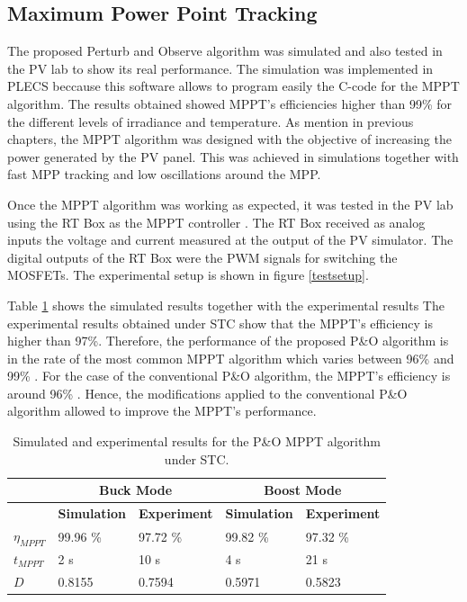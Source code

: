 \subsection{Maximum Power Point Tracking}

The proposed Perturb and Observe algorithm was simulated and also tested in the PV lab to show its real performance. The simulation was implemented in PLECS beccause this software allows to program easily the C-code for the MPPT algorithm. The results obtained showed MPPT's efficiencies higher than 99\% for the different levels of irradiance and temperature. As mention in previous chapters, the MPPT algorithm was designed with the objective of increasing the power generated by the PV panel. This was achieved in simulations together with fast MPP tracking and low oscillations around the MPP. 

Once the MPPT algorithm was working as expected, it was tested in the PV lab using the RT Box as the MPPT controller \cite{RTbox}. The RT Box received as analog inputs the voltage and current measured at the output of the PV simulator. The digital outputs of the RT Box were the PWM signals for switching the MOSFETs. The experimental setup is shown in figure \ref{testsetup}.

Table \ref{tab:comparisonMPPT} shows the simulated results together with the experimental results The experimental results obtained under STC show that the MPPT's efficiency is higher than 97\%. Therefore, the performance of the proposed P\&O algorithm is in the rate of the most common MPPT algorithm which varies between 96\% and 99\% \cite{MPPTResearch}. For the case of the conventional P\&O algorithm, the MPPT's efficiency is around 96\% \cite{MPPTResearch}. Hence, the modifications applied to the conventional P\&O algorithm allowed to improve the MPPT's performance. 

\begin{table}[H]
	\centering
	\begin{tabular}{|>{\centering}p{2.3cm}|p{2.3cm}|p{2.3cm}|p{2.3cm}|p{2.3cm}|}
		\hline
		 \rowcolor{lightgray} & \multicolumn{2}{|c|}{ \textbf{Buck Mode}} & \multicolumn{2}{|c|}{ \textbf{Boost Mode}} \tabularnewline \hline
		\rowcolor{lightgray} \textbf{} & \textbf{Simulation}  & \textbf{Experiment} & \textbf{Simulation}  & \textbf{Experiment}  \tabularnewline \hline
		$\eta_{MPPT}$ & 99.96 \% & 97.72 \% & 99.82 \% & 97.32 \% \tabularnewline \hline
		$t_{MPPT}$ & 2 s & 10 s & 4 s & 21 s \tabularnewline \hline
		$D$  & 0.8155 & 0.7594 & 0.5971 & 0.5823 \tabularnewline \hline
	\end{tabular}
	\caption{Simulated and experimental results for the P\&O MPPT algorithm under STC.}
	\label{tab:comparisonMPPT}
\end{table}

